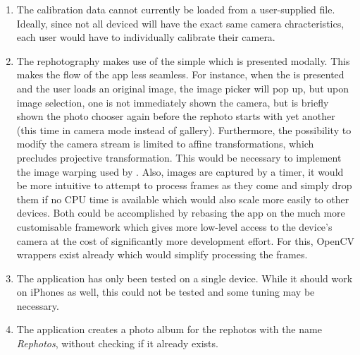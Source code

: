 \begin{enumerate}
   \item The calibration data cannot currently be loaded from a user-supplied
      file. Ideally, since not all deviced will have the exact same camera
      chracteristics, each user would have to individually calibrate their
      camera.

   \item The rephotography makes use of the simple
       which is presented modally. This makes the
      flow of the app less seamless. For instance, when the
       is presented and the user loads an original image,
      the image picker will pop up, but upon image selection, one is not
      immediately shown the camera, but is briefly shown the photo chooser again
      before the rephoto starts with yet another 
      (this time in camera mode instead of gallery).
      Furthermore, the possibility to modify the camera stream is limited to
      affine transformations, which precludes projective transformation. This
      would be necessary to implement the image warping used by \citet{bae2010}.
      Also, images are captured by a timer, it would be more intuitive to
      attempt to process frames as they come and simply drop them if no CPU time
      is available which would also scale more easily to other devices. Both
      could be accomplished by rebasing the app on the much more customisable
       framework which gives more low-level access to the device's
      camera at the cost of significantly more development effort.
      For this, OpenCV wrappers exist already which would simplify processing the frames.  

   \item The application has only been tested on a single device. While it
      should work on iPhones as well, this could not be tested and some tuning
      may be necessary.

   \item The application creates a photo album for the rephotos with the name
      \emph{Rephotos}, without checking if it already exists.

\end{enumerate}


